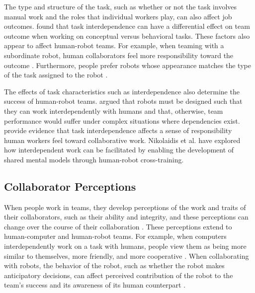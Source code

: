 The type and structure of the task, such as whether or not the task involves manual work and the roles that individual workers play, can also affect job outcomes. \citet{stewart2000team} found that task interdependence can have a differential effect on team outcome when working on conceptual versus behavioral tasks. These factors also appear to affect human-robot teams. For example, when teaming with a subordinate robot, human collaborators feel more responsibility toward the outcome \cite{hinds2004whose}. Furthermore, people prefer robots whose appearance matches the type of the task assigned to the robot \cite{goetz2003matching}.

The effects of task characteristics such as interdependence also determine the success of human-robot teams. \citet{johnson2012autonomy} argued that robots must be designed such that they can work interdependently with humans and that, otherwise, team performance would suffer under complex situations where dependencies exist. \citet{hinds2004whose} provide evidence that task interdependence affects a sense of responsibility human workers feel toward collaborative work. Nikolaidis et al. \cite{nikolaidis2012human, nikolaidis2013human} have explored how interdependent work can be facilitated by enabling the development of shared mental models through human-robot cross-training.

\subsection{Collaborator Perceptions}
When people work in teams, they develop perceptions of the work and traits of their collaborators, such as their ability and integrity, and these perceptions can change over the course of their collaboration \cite{jarvenpaa1994global}. These perceptions extend to human-computer and human-robot teams. For example, when computers interdependently work on a task with humans, people view them as being more similar to themselves, more friendly, and more cooperative \cite{nass1996can}. When collaborating with robots, the behavior of the robot, such as whether the robot makes anticipatory decisions, can affect perceived contribution of the robot to the team's success \cite{hoffman2007effects} and its awareness of its human counterpart \cite{huang2015adaptive,huang2016anticipatory}.

